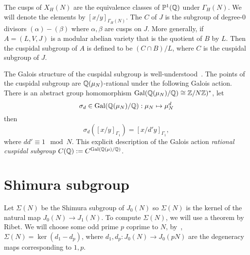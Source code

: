 \documentclass[11pt, proquest]{uwthesis}
\begin{document}
The cusps of $X_H(N)$ are the equivalence classes of $\mathbb{P}^1(\mathbb{Q})$ under
$\Gamma_H(N)$. We will denote the elements by $[x/y]_{\Gamma_H(N)}$. The
 $C$ of $J$ is the subgroup of degree-0 divisors
$(\alpha)-(\beta)$ where $\alpha, \beta$ are cusps on $J$. More generally, if
$A=(L, V, J)$ is a modular abelian variety that is the quotient of $B$ by $L$.
Then the cuspidal subgroup of $A$ is defined to be $(C\cap B)/L$, where $C$ is
the cuspidal subgroup of $J$.

The Galois structure of the cuspidal subgroup is well-understood~\cite[\S
1.3]{stevens:thesis}. The points of the cuspidal subgroup are
$\mathbb{Q}(\mu_N)$-rational under the following Galois action. There is an abstract
group homomorphism $\operatorname{Gal}(\mathbb{Q}(\mu_N)/\mathbb{Q})\cong \mathbb{Z}/N\mathbb{Z})^*$, let
\[
    \sigma_d\in \operatorname{Gal}(\mathbb{Q}(\mu_N)/\mathbb{Q}):\mu_N\mapsto \mu_N ^d
\]
then
\[
    \sigma_d([x/y]_{\Gamma_1})=[x/d'y]_{\Gamma_1},
\]
where $dd'\equiv 1 \mod{N}$. This explicit description of the Galois action
\emph{rational cuspidal subgroup} $C(\mathbb{Q}):=C^{\operatorname{Gal}(\mathbb{Q}(\mu)/\mathbb{Q})}$.

\section{Shimura subgroup}

Let $\Sigma(N)$ be the Shimura subgroup of $J_0(N)$ so $\Sigma(N)$ is the
kernel of the natural map $J_0(N)\to J_1(N)$. To compute $\Sigma(N)$, we will
use a theorem by Ribet. We will choose some odd prime $p$ coprime to $N$,
by~\cite[Prop. 1]{ribet:raising}, $\Sigma(N)=\ker(d_1-d_p)$, where
$d_1,d_p:J_0(N)\to J_0(pN)$ are the degeneracy maps corresponding to $1,p$.
\end{document}
